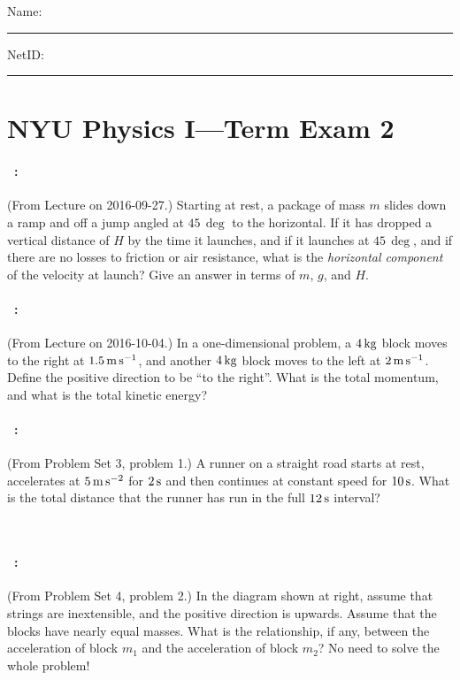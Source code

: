 \documentclass[12pt]{article}
\begin{document}
\noindent
Name: \rule[-1ex]{0.55\textwidth}{0.1pt}
NetID: \rule[-1ex]{0.2\textwidth}{0.1pt}

\section*{NYU Physics I---Term Exam 2}

\paragraph{\problemname~\theproblem:}%
(From Lecture on 2016-09-27.) Starting at rest, a package of mass $m$
slides down a ramp and off a jump angled at $45\,\deg$ to the
horizontal. If it has dropped a vertical distance of $H$ by the time
it launches, and if it launches at $45\,\deg$, and if there are no
losses to friction or air resistance, what is the \emph{horizontal
  component} of the velocity at launch? Give an answer in terms of
$m$, $g$, and $H$.

\vfill

\paragraph{\problemname~\theproblem:}%
(From Lecture on 2016-10-04.) In a one-dimensional problem, a $4\,\mathrm{kg}$
block moves to the right at $1.5\,\mathrm{m}\,\mathrm{s}^{-1}$, and another $4\,\mathrm{kg}$ block
moves to the left at $2\,\mathrm{m}\,\mathrm{s}^{-1}$. Define the positive direction to be
``to the right''. What is the total momentum, and what is the total
kinetic energy?

\vfill

\paragraph{\problemname~\theproblem:}%
(From Problem Set 3, problem 1.) A runner on a straight road starts
at rest, accelerates at $5\,\mathrm{m}\,\mathrm{s}^{-2}$ for $2\,\mathrm{s}$ and then continues at
constant speed for $10\,\mathrm{s}$. What is the total distance that the
runner has run in the full $12\,\mathrm{s}$ interval?

\vfill
~

\clearpage
\paragraph{\problemname~\theproblem:}%
(From Problem Set 4, problem 2.) In the diagram shown at right, assume
that strings are inextensible, and the positive direction is
upwards. Assume that the blocks have nearly equal masses. What is the
relationship, if any, between the acceleration of block $m_1$ and the
acceleration of block $m_2$? No need to solve the whole problem!
\end{document}
